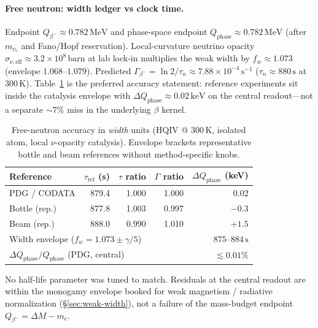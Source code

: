 \documentclass[11pt,notitlepage]{amsart}
\begin{document}
\paragraph{Free neutron: width ledger vs clock time.}
Endpoint $Q_{\beta^-}\approx 0.782\,\mathrm{MeV}$ and phase-space endpoint
$Q_{\mathrm{phase}}\approx 0.782\,\mathrm{MeV}$ (after $m_{\nu_e}$ and Fano/Hopf
reservation). Local-curvature neutrino opacity
$\sigma_{\nu,\mathrm{eff}}\approx 3.2\times 10^{8}\,\mathrm{barn}$ at lab lock-in
multiplies the weak width by $f_w\approx 1.073$ (envelope $1.068$--$1.079$).
Predicted $\Gamma_{\beta^-}=\ln 2/\tau_n\approx 7.88\times 10^{-4}\,\mathrm{s}^{-1}$
($\tau_n\approx 880\,\mathrm{s}$ at $300\,\mathrm{K}$). Table~\ref{tab:neutron-width}
is the preferred accuracy statement: reference experiments sit inside the catalysis
envelope with $\Delta Q_{\mathrm{phase}}\approx 0.02\,\mathrm{keV}$ on the central
readout---not a separate $\sim 7\%$ miss in the underlying $\beta$ kernel.

\begin{table}[h]
\centering
\caption{Free-neutron accuracy in \emph{width} units (HQIV @ $300\,\mathrm{K}$,
isolated atom, local $\nu$-opacity catalysis). Envelope brackets representative bottle
and beam references without method-specific knobs.}
\label{tab:neutron-width}
\begin{tabular}{@{}lrrrr@{}}
\toprule
Reference & $\tau_{\mathrm{ref}}$ (s) & $\tau$ ratio & $\Gamma$ ratio &
  $\Delta Q_{\mathrm{phase}}$ (keV) \\
\midrule
PDG / CODATA & 879.4 & 1.000 & 1.000 & 0.02 \\
Bottle (rep.) & 877.8 & 1.003 & 0.997 & $-0.3$ \\
Beam (rep.) & 888.0 & 0.990 & 1.010 & $+1.5$ \\
\midrule
\multicolumn{4}{l}{Width envelope ($f_w=1.073\pm\gamma/5$)} &
  $875$--$884\,\mathrm{s}$ \\
\multicolumn{4}{l}{$\Delta Q_{\mathrm{phase}}/Q_{\mathrm{phase}}$ (PDG, central)} &
  $\lesssim 0.01\%$ \\
\bottomrule
\end{tabular}
\end{table}

No half-life parameter was tuned to match. Residuals at the central readout are within
the monogamy envelope booked for weak magnetism / radiative normalization
(\S\ref{sec:weak-width}), not a failure of the mass-budget endpoint
$Q_{\beta^-}=\Delta M-m_e$.
\end{document}
